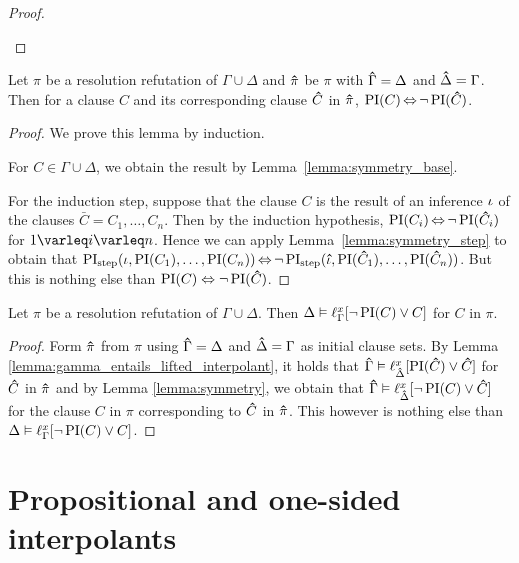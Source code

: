 \begin{proof}
\begin{indproof}
	\end{indproof}

\end{proof}



\begin{lemma}
	\label{lemma:symmetry}
	Let $\pi$ be a resolution refutation of $\Gamma \cup \Delta$ and
	$\bm\hat{\pi}$ be $\pi$ with $\bm\hat{\Gamma} = \Delta$ and $\bm\hat{\Delta} = \Gamma$.
	Then for a clause $C$ and its corresponding clause $\bm\hat{C}$ in $\bm\hat{\pi}$, $\operatorname{PI}(C) \operatorname{\Leftrightarrow} \lnot \operatorname{PI}(\bm\hat{C})$.
\end{lemma}
\begin{proof}
	We prove this lemma by induction.

	For $C \in \Gamma \cup \Delta$, we obtain the result by Lemma~\ref{lemma:symmetry_base}.


	For the induction step, suppose that the clause $C$ is the result of an inference $\iota$ of the clauses $\bar C = C_1, \dots, C_n$.
	Then by the induction hypothesis, $\operatorname{PI}(C_i) \operatorname{\Leftrightarrow} \lnot \operatorname{PI}(\bm\hat{C}_i)$ for $1 \varleq i \varleq n$. 
	Hence we can apply Lemma~\ref{lemma:symmetry_step} to obtain that $\operatorname{PI}_{\mathrm{step}}(\iota, \operatorname{PI}(C_1), \dots, \operatorname{PI}(C_n)) \operatorname{\Leftrightarrow} \lnot \operatorname{PI}_{\mathrm{step}}(\bm\hat{\iota}, \operatorname{PI}(\bm\hat{C}_1), \dots, \operatorname{PI}(\bm\hat{C}_n))$.
	But this is nothing else than $\operatorname{PI}(C) \;{\operatorname{\Leftrightarrow}}\; \lnot \operatorname{PI}(\bm\hat{C})$.
\end{proof}


\begin{corr}
	\label{cor:delta_entails_lifted_interpolant}
	Let $\pi$ be a resolution refutation of $\Gamma \cup \Delta$. 
	Then $\Delta \vDash \ell_{\Gamma}^{x}[ \lnot \operatorname{PI}(C) \lor C ]$ for $C$ in $\pi$.
\end{corr}
\begin{proof}
	Form $\bm\hat{\pi}$ from $\pi$ using $\bm\hat{\Gamma} = \Delta$ and $\bm\hat{\Delta} = \Gamma$ as initial clause sets.
	By Lemma \ref{lemma:gamma_entails_lifted_interpolant}, it holds that $\bm\hat{\Gamma} \vDash \ell_{\bm\hat{\Delta}}^{x}[ \operatorname{PI}(\bm\hat{C}) \lor \bm\hat{C} ]$ for $\bm\hat{C}$ in $\bm\hat{\pi}$ and 
	by Lemma \ref{lemma:symmetry}, we obtain that 
	$\bm\hat{\Gamma} \vDash \ell_{\bm\hat{\Delta}}^{x}[ \lnot \operatorname{PI}(C) \lor \bm\hat{C} ]$ for the clause $C$ in $\pi$ corresponding to $\bm\hat{C}$ in $\bm\hat{\pi}$. 
	This however is nothing else than 
	$\Delta \entails\nolinebreak \lft{\Gamma}{x}{ \lnot \PI(C) \lor C }$.
\end{proof}


\section{Propositional and one-sided interpolants}

